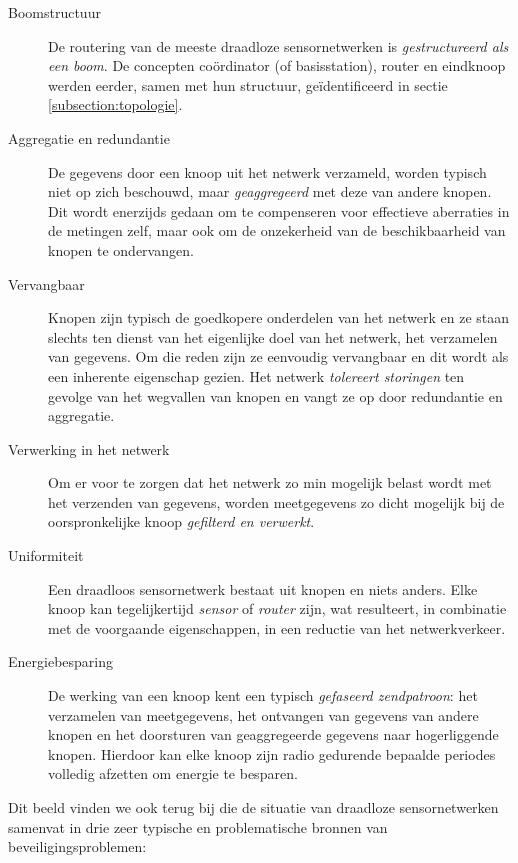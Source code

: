 \begin{description}

  \item[Boomstructuur] De routering van de meeste draadloze sensornetwerken is
  \emph{gestructureerd als een boom}. De concepten co\"ordinator (of
  basisstation), router en eindknoop werden eerder, samen met hun structuur,
  ge\"identificeerd in sectie \ref{subsection:topologie}.

  \item[Aggregatie en redundantie] De gegevens door een knoop uit het netwerk
  verzameld, worden typisch niet op zich beschouwd, maar \emph{geaggregeerd}
  met deze van andere knopen. Dit wordt enerzijds gedaan om te compenseren voor
  effectieve aberraties in de metingen zelf, maar ook om de onzekerheid van de
  beschikbaarheid van knopen te ondervangen.

  \item[Vervangbaar] Knopen zijn typisch de goedkopere onderdelen van het
  netwerk en ze staan slechts ten dienst van het eigenlijke doel van het
  netwerk, het verzamelen van gegevens. Om die reden zijn ze eenvoudig
  vervangbaar en dit wordt als een inherente eigenschap gezien. Het netwerk
  \emph{tolereert storingen} ten gevolge van het wegvallen van knopen en vangt
  ze op door redundantie en aggregatie.

  \item[Verwerking in het netwerk] Om er voor te zorgen dat het netwerk zo min
  mogelijk belast wordt met het verzenden van gegevens, worden meetgegevens zo
  dicht mogelijk bij de oorspronkelijke knoop \emph{gefilterd en verwerkt}.

  \item[Uniformiteit] Een draadloos sensornetwerk bestaat uit knopen en niets
  anders. Elke knoop kan tegelijkertijd \emph{sensor} of \emph{router} zijn,
  wat resulteert, in combinatie met de voorgaande eigenschappen, in een
  reductie van het netwerkverkeer.

  \item[Energiebesparing] De werking van een knoop kent een typisch
  \emph{gefaseerd zendpatroon}: het verzamelen van meetgegevens, het ontvangen
  van gegevens van andere knopen en het doorsturen van geaggregeerde gegevens
  naar hogerliggende knopen. Hierdoor kan elke knoop zijn radio gedurende
  bepaalde periodes volledig afzetten om energie te besparen.

\end{description}

Dit beeld vinden we ook terug bij \citep{aschenbruck2012security} die de
situatie van draadloze sensornetwerken samenvat in drie zeer typische en
problematische bronnen van beveiligingsproblemen: 

